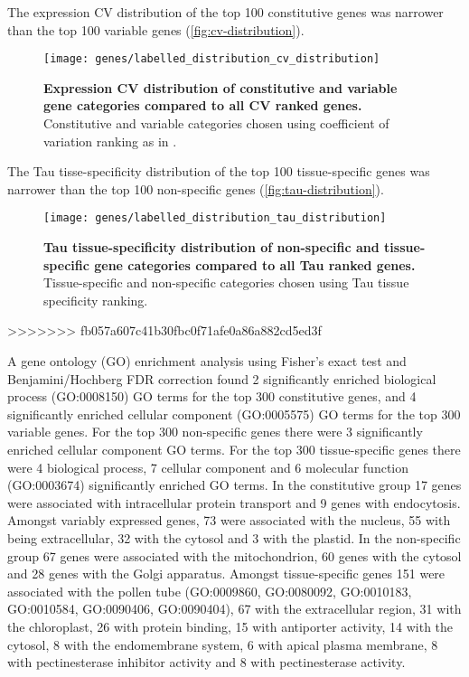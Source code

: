 \documentclass[../main.tex]{subfiles}
\begin{document}
The expression CV distribution of the top 100 constitutive genes was narrower than the top 100 variable genes (\autoref{fig:cv-distribution}).

\begin{figure}[hbt!]
	\begin{center}
		\capstart
		\texttt{[image: genes/labelled\_distribution\_cv\_distribution]}
		\caption{
			\textbf{Expression CV distribution of constitutive and variable gene categories compared to all CV ranked genes.}
			Constitutive and variable categories chosen using coefficient of variation ranking as in \textcite{czechowskiGenomeWideIdentificationTesting2005}.
			\label{fig:cv-distribution}
		}
	\end{center}
\end{figure}

The Tau tisse\hyp{}specificity distribution of the top 100 tissue\hyp{}specific genes was narrower than the top 100 non\hyp{}specific genes (\autoref{fig:tau-distribution}).


\begin{figure}[hbt!]
	\begin{center}
		\capstart
		\texttt{[image: genes/labelled\_distribution\_tau\_distribution]}
		\caption{
			\textbf{Tau tissue\hyp{}specificity distribution of non\hyp{}specific and tissue\hyp{}specific gene categories compared to all Tau ranked genes.}
			Tissue\hyp{}specific and non\hyp{}specific categories chosen using Tau tissue specificity ranking.
			\label{fig:tau-distribution}
		}
	\end{center}
\end{figure}
>>>>>>> fb057a607c41b30fbc0f71afe0a86a882cd5ed3f

A gene ontology (GO) enrichment analysis using Fisher's exact test \autocite{fisherInterpretationContingencyTables1922} and Benjamini/Hochberg FDR correction \autocite{benjaminiControllingFalseDiscovery1995} found 2 significantly enriched biological process (GO:0008150) GO terms for the top 300 constitutive genes, and 4 significantly enriched cellular component (GO:0005575) GO terms for the top 300 variable genes. For the top 300 non\hyp{}specific genes there were 3 significantly enriched cellular component GO terms. For the top 300 tissue\hyp{}specific genes there were 4 biological process, 7 cellular component and 6 molecular function (GO:0003674) significantly enriched GO terms.
In the constitutive group 17 genes were associated with intracellular protein transport and 9 genes with endocytosis.
Amongst variably expressed genes, 73 were associated with the nucleus, 55 with being extracellular, 32 with the cytosol and 3 with the plastid.
In the non\hyp{}specific group 67 genes were associated with the mitochondrion, 60 genes with the cytosol and 28 genes with the Golgi apparatus.
Amongst tissue\hyp{}specific genes 151 were associated with the pollen tube (GO:0009860, GO:0080092, GO:0010183, GO:0010584, GO:0090406, GO:0090404), 67 with the extracellular region,  31 with the chloroplast, 26 with protein binding, 15 with antiporter activity, 14 with the cytosol, 8 with the endomembrane system, 6 with apical plasma membrane,  8 with pectinesterase inhibitor activity and 8 with pectinesterase activity.
\end{document}
